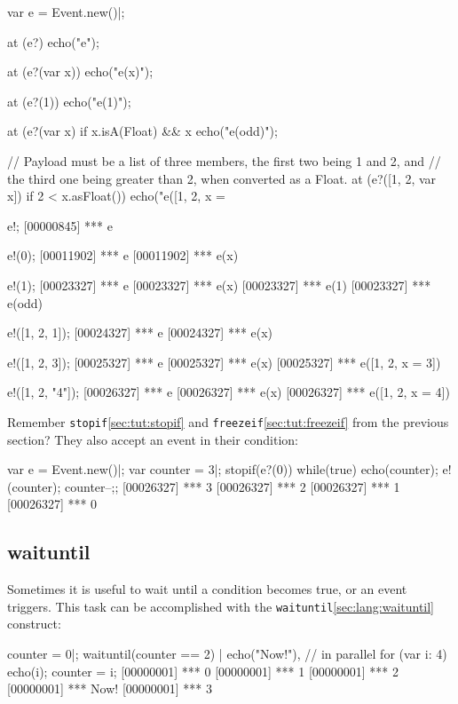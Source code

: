 \begin{urbiscript}
var e = Event.new()|;

at (e?)
  echo("e");

at (e?(var x))
  echo("e(x)");

at (e?(1))
  echo("e(1)");

at (e?(var x) if x.isA(Float) && x %
  echo("e(odd)");

// Payload must be a list of three members, the first two being 1 and 2, and
// the third one being greater than 2, when converted as a Float.
at (e?([1, 2, var x]) if 2 < x.asFloat())
  echo("e([1, 2, x = %

e!;
[00000845] *** e

e!(0);
[00011902] *** e
[00011902] *** e(x)

e!(1);
[00023327] *** e
[00023327] *** e(x)
[00023327] *** e(1)
[00023327] *** e(odd)

e!([1, 2, 1]);
[00024327] *** e
[00024327] *** e(x)

e!([1, 2, 3]);
[00025327] *** e
[00025327] *** e(x)
[00025327] *** e([1, 2, x = 3])

e!([1, 2, "4"]);
[00026327] *** e
[00026327] *** e(x)
[00026327] *** e([1, 2, x = 4])
\end{urbiscript}

Remember \lstinline{stopif}\ref{sec:tut:stopif} and
\lstinline{freezeif}\ref{sec:tut:freezeif} from the previous section? They also
accept an event in their condition:

\begin{urbiscript}[firstnumber=1]
var e = Event.new()|;
var counter = 3|;
stopif(e?(0)) while(true) { echo(counter); e!(counter); counter--;};
[00026327] *** 3
[00026327] *** 2
[00026327] *** 1
[00026327] *** 0
\end{urbiscript}

\subsection{waituntil}

Sometimes it is useful to wait until a condition becomes true, or an event
triggers. This task can be accomplished with the
\lstinline{waituntil}\ref{sec:lang:waituntil} construct:

\begin{urbiscript}
counter = 0|;
waituntil(counter == 2) | echo("Now!"), // in parallel
for (var i: 4) { echo(i); counter = i};
[00000001] *** 0
[00000001] *** 1
[00000001] *** 2
[00000001] *** Now!
[00000001] *** 3
\end{urbiscript}




